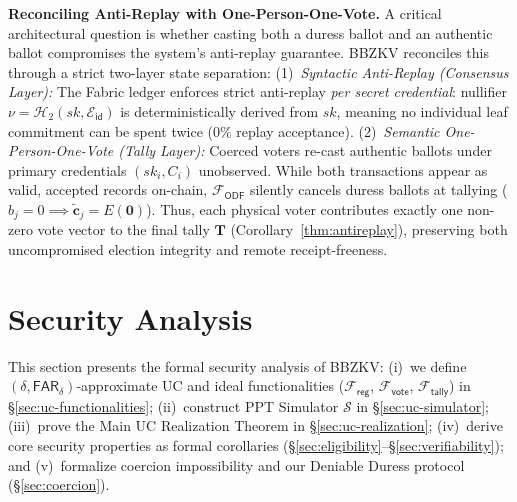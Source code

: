 \documentclass[10pt,letterpaper,journal]{IEEEtran}
\begin{document}
\textbf{Reconciling Anti-Replay with One-Person-One-Vote.}
A critical architectural question is whether casting both a duress ballot and an authentic ballot compromises the system's anti-replay guarantee. \textsc{BBZKV} reconciles this through a strict two-layer state separation:
(1)~\emph{Syntactic Anti-Replay (Consensus Layer):} The Fabric ledger enforces strict anti-replay \emph{per secret credential}: nullifier $\nu = \mathcal{H}_2(sk, \mathcal{E}_{\mathsf{id}})$ is deterministically derived from $sk$, meaning no individual leaf commitment can be spent twice ($0\%$ replay acceptance).
(2)~\emph{Semantic One-Person-One-Vote (Tally Layer):} Coerced voters re-cast authentic ballots under primary credentials $(sk_i, C_i)$ unobserved. While both transactions appear as valid, accepted records on-chain, $\mathcal{F}_{\mathsf{ODF}}$ silently cancels duress ballots at tallying ($b_j = 0 \implies \tilde{\mathbf{c}}_j = E(\mathbf{0})$). Thus, each physical voter contributes exactly one non-zero vote vector to the final tally $\mathbf{T}$ (Corollary~\ref{thm:antireplay}), preserving both uncompromised election integrity and remote receipt-freeness.



\section{Security Analysis}
\label{sec:security}

This section presents the formal security analysis of \textsc{BBZKV}: (i)~we define $(\delta, \mathsf{FAR}_\delta)$-approximate UC and ideal functionalities ($\mathcal{F}_{\mathsf{reg}}$, $\mathcal{F}_{\mathsf{vote}}$, $\mathcal{F}_{\mathsf{tally}}$) in \S\ref{sec:uc-functionalities}; (ii)~construct PPT Simulator $\mathcal{S}$ in \S\ref{sec:uc-simulator}; (iii)~prove the Main UC Realization Theorem in \S\ref{sec:uc-realization}; (iv)~derive core security properties as formal corollaries (\S\ref{sec:eligibility}--\S\ref{sec:verifiability}); and (v)~formalize coercion impossibility and our Deniable Duress protocol (\S\ref{sec:coercion}).
\end{document}
